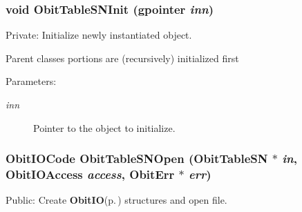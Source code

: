 \subsubsection{\setlength{\rightskip}{0pt plus 5cm}void Obit\-Table\-SNInit (gpointer {\em inn})}\label{ObitTableSN_8c_a8}


Private: Initialize newly instantiated object. 

Parent classes portions are (recursively) initialized first \begin{Desc}
\item[Parameters:]
\begin{description}
\item[{\em inn}]Pointer to the object to initialize. \end{description}
\end{Desc}
\subsubsection{\setlength{\rightskip}{0pt plus 5cm}Obit\-IOCode Obit\-Table\-SNOpen ({\bf Obit\-Table\-SN} $\ast$ {\em in}, Obit\-IOAccess {\em access}, {\bf Obit\-Err} $\ast$ {\em err})}\label{ObitTableSN_8c_a21}


Public: Create {\bf Obit\-IO}{\rm (p.\,\pageref{structObitIO})} structures and open file. 

